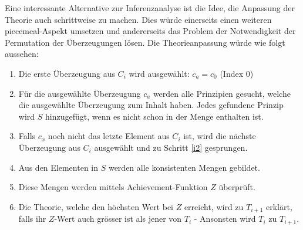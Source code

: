 \documentclass{article}
\begin{document}
Eine interessante Alternative zur Inferenzanalyse ist die Idee, die Anpassung der Theorie auch schrittweise zu machen. Dies würde einerseits einen weiteren piecemeal-Aspekt umsetzen und andererseits das Problem der Notwendigkeit der Permutation der Überzeugungen lösen. Die Theorieanpassung würde wie folgt aussehen:

\begin{enumerate}
    \item Die erste Überzeugung aus $C_i$ wird ausgewählt: $c_a = c_0$ (Index 0)
    \item Für die ausgewählte Überzeugung $c_a$ werden alle Prinzipien gesucht, welche die ausgewählte Überzeugung zum Inhalt haben. Jedes gefundene Prinzip wird $S$ hinzugefügt, wenn es nicht schon in der Menge enthalten ist.
    \item Falls $c_x$ noch nicht das letzte Element aus $C_i$ ist, wird die nächste Überzeugung aus $C_i$ ausgewählt und zu Schritt \ref{i2} gesprungen.
    \item Aus den Elementen in $S$ werden alle konsistenten Mengen gebildet.
    \item Diese Mengen werden mittels Achievement-Funktion $Z$ überprüft.
    \item Die Theorie, welche den höchsten Wert bei $Z$ erreicht, wird zu $T_{i+1}$ erklärt, falls ihr $Z$-Wert auch grösser ist als jener von $T_i$ - Ansonsten wird $T_i$ zu $T_{i+1}$.
\end{enumerate}

\newpage
\printbibliography
\end{document}
